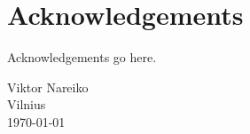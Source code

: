 {}
\chapter*{Acknowledgements}

Acknowledgements go here. 

{\flushright  Viktor Nareiko\\ Vilnius\\ \today\\ }

